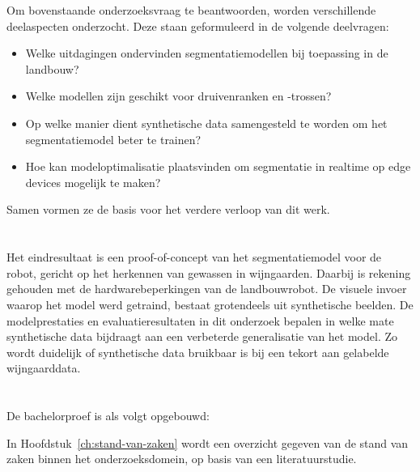 Om bovenstaande onderzoeksvraag te beantwoorden, worden verschillende deelaspecten onderzocht. Deze staan geformuleerd in de volgende deelvragen:

\begin{itemize}
    \setlength{\itemsep}{0pt}
    \setlength{\parskip}{0pt}
    \item Welke uitdagingen ondervinden segmentatiemodellen bij toepassing in de landbouw?
    \item Welke modellen zijn geschikt voor druivenranken en -trossen?
    \item Op welke manier dient synthetische data samengesteld te worden om het segmentatiemodel beter te trainen?
    \item Hoe kan modeloptimalisatie plaatsvinden om segmentatie in realtime op edge devices mogelijk te maken?
\end{itemize}

Samen vormen ze de basis voor het verdere verloop van dit werk.

\section{}%
\label{sec:onderzoeksdoelstelling}

Het eindresultaat is een proof-of-concept van het segmentatiemodel voor de robot, gericht op het herkennen van gewassen in wijngaarden. Daarbij is rekening gehouden met de hardwarebeperkingen van de landbouwrobot. De visuele invoer waarop het model werd getraind, bestaat grotendeels uit synthetische beelden. De modelprestaties en evaluatieresultaten in dit onderzoek bepalen in welke mate synthetische data bijdraagt aan een verbeterde generalisatie van het model. Zo wordt duidelijk of synthetische data bruikbaar is bij een tekort aan gelabelde wijngaarddata.

\section{}%
\label{sec:opzet-bachelorproef}

De bachelorproef is als volgt opgebouwd:

In Hoofdstuk~\ref{ch:stand-van-zaken} wordt een overzicht gegeven van de stand van zaken binnen het onderzoeksdomein, op basis van een literatuurstudie.

